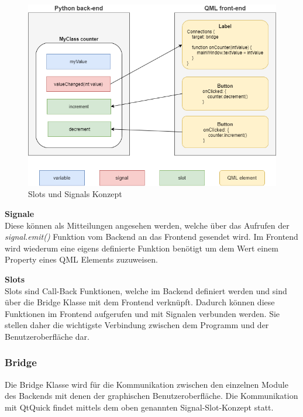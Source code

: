 \begin{figure}[H]
	\begin{center}
		\includegraphics[scale=0.4]{figures/hcis/signals_slots.png}
		\caption{Slots und Signals Konzept}
	\end{center}
\end{figure}

\textbf{Signale}\\ \medskip
Diese können als Mitteilungen angesehen werden, welche über das Aufrufen der \textit{signal.emit()} Funktion vom Backend an das Frontend gesendet wird. Im Frontend wird wiederum eine eigens definierte Funktion benötigt um dem Wert einem Property eines QML Elements zuzuweisen.
\medskip

\textbf{Slots}\\ \medskip
Slots sind Call-Back Funktionen, welche im Backend definiert werden und sind über die Bridge Klasse mit dem Frontend verknüpft. Dadurch können diese Funktionen im Frontend aufgerufen und mit Signalen verbunden werden. Sie stellen daher die wichtigste Verbindung zwischen dem Programm und der Benutzeroberfläche dar. 


\newpage
	
\subsubsection{Bridge} \label{sec:bridge}

Die Bridge Klasse wird für die Kommunikation zwischen den einzelnen Module des Backends mit denen der graphischen Benutzeroberfläche. Die Kommunikation mit QtQuick findet mittels dem oben genannten Signal-Slot-Konzept statt.

